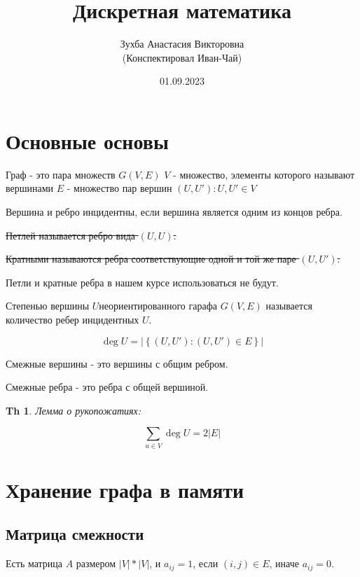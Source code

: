 \documentclass[a6paper, 10pt]{article}
\theoremstyle{plain}
\newtheorem*{theorem}{Th}
\begin{document}
	\author{Зухба Анастасия Викторовна\\(Конспектировал Иван-Чай)}
	\date{01.09.2023}
	\title{Дискретная математика}

	\linespread{1.4}
	\selectfont

	\maketitle
	\newpage

	\section{Основные основы}

	Граф - это пара множеств
	$ G(V, E) $
	$ V $ - множество, элементы которого называют вершинами
	$ E $ - множество пар вершин $ (U, U'): U, U' \in V $

	Вершина и ребро инцидентны, если вершина является одним из концов ребра.

	\sout{Петлей называется ребро вида $ (U, U) $.}

	\sout{Кратными называются ребра соответствующие одной и той же паре $ (U, U') $.}

	Петли и кратные ребра в нашем курсе использоваться не будут.

	Степенью вершины $ U $неориентированного гарафа $ G(V, E) $ называется
	количество ребер инцидентных $ U $.

	\[ %
		\deg{U} = \left| \left\{ (U, U'): (U, U') \in E \right\} \right|
	\] %

	Смежные вершины - это вершины с общим ребром.

	Смежные ребра - это ребра с общей вершиной.

	\begin{theorem}
	Лемма о рукопожатиях:

	\[ %
	\sum_{u \in V} \deg{U} = 2 \left| E \right|
	\] %
	\end{theorem}

	\section{Хранение графа в памяти}

	\subsection{Матрица смежности}

	Есть матрица $ A $ размером $ \left| V \right| * \left| V \right| $, и
	$ a_{ij} = 1 $, если $ (i, j) \in E $, иначе $ a_{ij} = 0 $.
\end{document}
